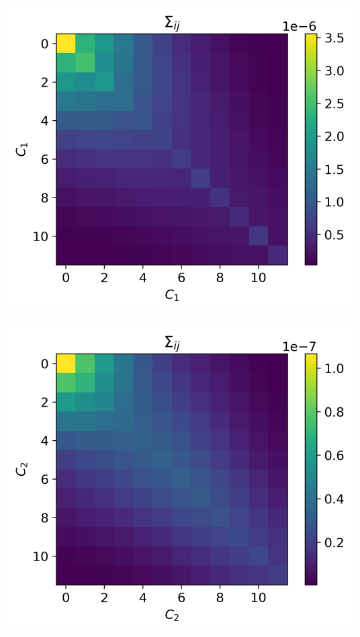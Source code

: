 \documentclass[a4paper,12pt]{report}
\begin{document}
\begin{figure}[t]
    \centering
    \begin{subfigure}[b]{0.3\textwidth}
        \centering
        \includegraphics[width=\textwidth]{COMPOSITE cov/dip only cov.png}
        \caption{}
    \end{subfigure}
    \hfill
    \begin{subfigure}[b]{0.3\textwidth}
        \centering
        \includegraphics[width=\textwidth]{COMPOSITE cov/quad only cov.png}

\end{subfigure}
\end{figure}
\end{document}

